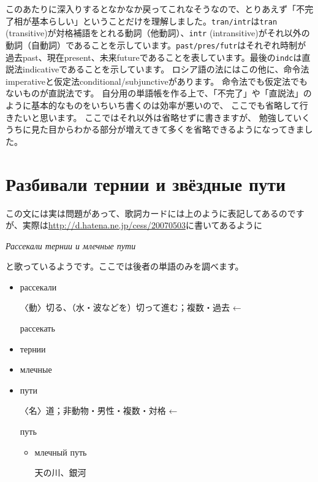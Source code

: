 \documentclass[12pt]{ltjsarticle}
\begin{document}
\bigskip

このあたりに深入りするとなかなか戻ってこれなそうなので、とりあえず「不完了相が基本らしい」ということだけを理解しました。\texttt{tran/intr}は\texttt{tran} (transitive)が対格補語をとれる動詞（他動詞）、\texttt{intr} (intransitive)がそれ以外の動詞（自動詞）であることを示しています。\texttt{past/pres/futr}はそれぞれ時制が過去past、現在present、未来futureであることを表しています。最後の\texttt{indc}は直説法indicativeであることを示しています。
ロシア語の法にはこの他に、命令法imperativeと仮定法conditional/subjunctiveがあります。
命令法でも仮定法でもないものが直説法です。
自分用の単語帳を作る上で、「不完了」や「直説法」のように基本的なものをいちいち書くのは効率が悪いので、
ここでも省略して行きたいと思います。
ここではそれ以外は省略せずに書きますが、
勉強していくうちに見た目からわかる部分が増えてきて多くを省略できるようになってきました。

\section{Разбивали тернии и звёздные пути}
この文には実は問題があって、歌詞カードには上のように表記してあるのですが、実際は\href{http://d.hatena.ne.jp/cess/20070503}{http://d.hatena.ne.jp/cess/20070503}に書いてあるように \begin{russian}\textit{Рассекали тернии и млечные пути}\end{russian} と歌っているようです。ここでは後者の単語のみを調べます。
\begin{itemize}
\item \begin{russian}рассекали\end{russian} 〈動〉切る、（水・波などを）切って進む；複数・過去 ← \begin{russian}рассекать\end{russian}
\item \begin{russian}тернии\end{russian}
\item \begin{russian}млечные\end{russian} 
\item \begin{russian}пути\end{russian} 〈名〉道；非動物・男性・複数・対格 ← \begin{russian}путь\end{russian} 
    \begin{itemize}
        \item \begin{russian}млечный путь\end{russian} 天の川、銀河
    \end{itemize}
\end{itemize}
\end{document}
